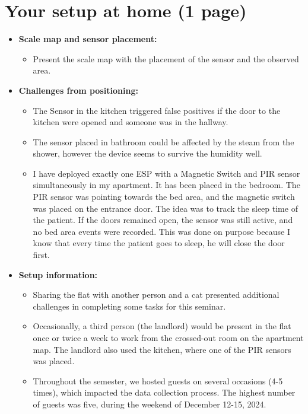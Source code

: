 \documentclass[A4,10pt]{article}
\begin{document}
\section{Your setup at home (1 page)}

\begin{itemize}
	\item \textbf{Scale map and sensor placement:}
	\begin{itemize}
		\item Present the scale map with the placement of the sensor and the observed area.
	\end{itemize}
\end{itemize}

\begin{itemize}
	\item \textbf{Challenges from positioning:}
	\begin{itemize}
		\item The Sensor in the kitchen triggered false positives if the door to the kitchen were opened and someone was in the hallway. 
		\item The sensor placed in bathroom could be affected by the steam from the shower, however the device seems to survive the humidity well.
		\item I have deployed exactly one ESP with a Magnetic Switch and PIR sensor simultaneously in my apartment. It has been placed in the bedroom. The PIR sensor was pointing towards the bed area, and the magnetic switch was placed on the entrance door. The idea was to track the sleep time of the patient. If the doors remained open, the sensor was still active, and no bed area events were recorded. This was done on purpose because I know that every time the patient goes to sleep, he will close the door first.
	\end{itemize}
	\item \textbf{Setup information:}
	\begin{itemize}
		\item Sharing the flat with another person and a cat presented additional challenges in completing some tasks for this seminar.
		\item Occasionally, a third person (the landlord) would be present in the flat once or twice a week to work from the crossed-out room on the apartment map. The landlord also used the kitchen, where one of the PIR sensors was placed.
		\item Throughout the semester, we hosted guests on several occasions (4-5 times), which impacted the data collection process. The highest number of guests was five, during the weekend of December 12-15, 2024.
	\end{itemize}
\end{itemize}
\end{document}
